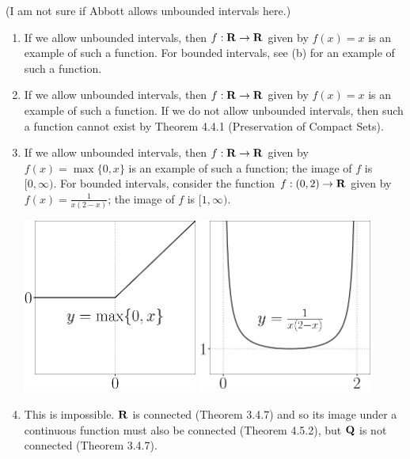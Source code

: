 \documentclass{lew98_solutions}
\begin{document}
\begin{solution}
    (I am not sure if Abbott allows unbounded intervals here.)
    \begin{enumerate}
        \item If we allow unbounded intervals, then \( f : \mathbf{R} \to \mathbf{R} \) given by \( f(x) = x \) is an example of such a function. For bounded intervals, see  (b) for an example of such a function.
        
        \item If we allow unbounded intervals, then \( f : \mathbf{R} \to \mathbf{R} \) given by \( f(x) = x \) is an example of such a function. If we do not allow unbounded intervals, then such a function cannot exist by Theorem 4.4.1 (Preservation of Compact Sets).

        \item If we allow unbounded intervals, then \( f : \mathbf{R} \to \mathbf{R} \) given by \( f(x) = \max \{ 0, x \} \) is an example of such a function; the image of \( f \) is \( [0, \infty) \). For bounded intervals, consider the function \( f : (0, 2) \to \mathbf{R} \) given by \( f(x) = \tfrac{1}{x(2 - x)} \); the image of \( f \) is \( [1, \infty) \).
        \begin{center}
            \includegraphics[width=0.45\textwidth]{UA_Figures/UA_ex4_5_2_fig_1.pdf}
            \hspace{2mm}
            \includegraphics[width=0.45\textwidth]{UA_Figures/UA_ex4_5_2_fig_2.pdf}
        \end{center}

        \item This is impossible. \( \mathbf{R} \) is connected (Theorem 3.4.7) and so its image under a continuous function must also be connected (Theorem 4.5.2), but \( \mathbf{Q} \) is not connected (Theorem 3.4.7).
    \end{enumerate}
\end{solution}
\end{document}
